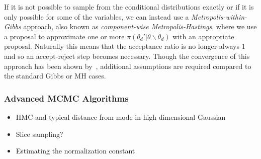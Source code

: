 If it is not possible to sample from the conditional distributions exactly or if it is only
possible for some of the variables, we can instead use a \emph{Metropolis-within-Gibbs} approach,
also known as \emph{component-wise Metropolis-Hastings}, where
we use a proposal to approximate one or more $\pi(\theta_d' | \theta \backslash \theta_d)$ with an
appropriate proposal.  Naturally this means that the acceptance ratio is no longer always $1$ and so
an accept-reject step becomes necessary.  Though the convergence of this approach has
been shown by~\cite{jones2014convergence}, additional assumptions are required compared to the
standard Gibbs or MH cases.

\subsubsection{Advanced MCMC Algorithms}
\label{sec:inf:foundation:advanced}


\begin{itemize}
	\item HMC and typical distance from mode in high dimensional Gaussian
	\item Slice sampling?
	\item Estimating the normalization constant
\end{itemize}